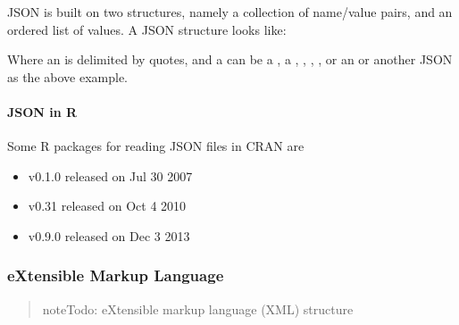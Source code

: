 \documentclass[a4paper,12pt,english]{sphinxhowto}
\begin{document}
JSON is built on two structures, namely a collection of name/value pairs, and an ordered list of values.
A JSON structure looks like:
\begin{quote}

\begin{sphinxVerbatim}[commandchars=\\\{\},formatcom=\footnotesize]
 
         
          \PYG{p}{[}
            
                    
        \PYG{p}{]}
\end{sphinxVerbatim}
\end{quote}

Where an  is delimited by quotes, and a  can be a , a , , , ,
or an  or another JSON  as the above example.


\paragraph{JSON in R}
\label{\detokenize{DDHH:json-in-r}}
Some R packages for reading JSON files in CRAN are
\begin{itemize}
\item {} 
 v0.1.0    released on Jul 30  2007

\item {} 
 v0.3\sphinxhyphen{}1  released on Oct  4  2010

\item {} 
 v0.9.0 released on Dec  3  2013

\end{itemize}



\subsubsection{eXtensible Markup Language}
\label{\detokenize{DDHH:extensible-markup-language}}\label{\detokenize{DDHH:xml-str}}\begin{quote}

\begin{sphinxadmonition}{note}{\label{\detokenize{DDHH:id1}}Todo:}
eXtensible markup language (XML) structure
\end{sphinxadmonition}
\end{quote}
\end{document}
